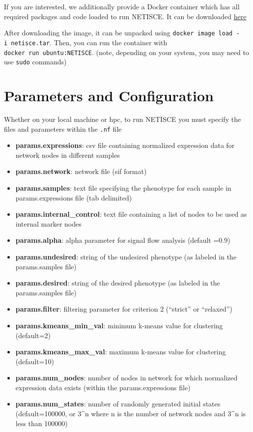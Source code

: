 \documentclass[
]{book}
\providecommand{\tightlist}{%
  \setlength{\itemsep}{0pt}\setlength{\parskip}{0pt}}
\begin{document}
If you are interested, we additionally provide a Docker container which has all required packages and code loaded to run NETISCE. It can be downloaded \href{https://www.dropbox.com/sh/8ix62io5axlq479/AADf8asm1hfxNZhXHqJoahoGa?dl=0}{here}

After downloading the image, it can be unpacked using \texttt{docker\ image\ load\ -i\ netisce.tar}. Then, you can run the container with \texttt{docker\ run\ ubuntu:NETISCE}. (note, depending on your system, you may need to use \texttt{sudo} commands)

\hypertarget{params}{%
\section{Parameters and Configuration}\label{params}}

Whether on your local machine or hpc, to run NETISCE you must specify the files and parameters within the \texttt{.nf} file

\begin{itemize}
\tightlist
\item
  \textbf{params.expressions}: csv file containing normalized expression data for network nodes in different samples
\item
  \textbf{params.network}: network file (sif format)
\item
  \textbf{params.samples}: text file specifying the phenotype for each sample in params.expressions file (tab delimited)
\item
  \textbf{params.internal\_control}: text file containing a list of nodes to be used as internal marker nodes
\item
  \textbf{params.alpha}: alpha parameter for signal flow analysis (default =0.9)
\item
  \textbf{params.undesired}: string of the undesired phenotype (as labeled in the params.samples file)
\item
  \textbf{params.desired}: string of the desired phenotype (as labeled in the params.samples file)
\item
  \textbf{params.filter}: filtering parameter for criterion 2 (``strict'' or ``relaxed'')
\item
  \textbf{params.kmeans\_min\_val}: minimum k-means value for clustering (default=2)
\item
  \textbf{params.kmeans\_max\_val}: maximum k-means value for clustering (default=10)
\item
  \textbf{params.num\_nodes}: number of nodes in network for which normalized expression data exists (within the params.expressions file)
\item
  \textbf{params.num\_states}: number of randomly generated initial states (default=100000, or 3\^{}n where n is the number of network nodes and 3\^{}n is less than 100000)
\end{itemize}
\end{document}
